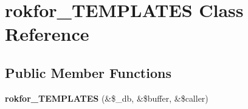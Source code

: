 \hypertarget{classrokfor___t_e_m_p_l_a_t_e_s}{
\section{rokfor\-\_\-\-T\-E\-M\-P\-L\-A\-T\-E\-S \-Class \-Reference}
\label{classrokfor___t_e_m_p_l_a_t_e_s}
}
\subsection*{\-Public \-Member \-Functions}
\begin{DoxyCompactItemize}
\item 
\hypertarget{classrokfor___t_e_m_p_l_a_t_e_s_a68ea25567fdd7bf7789e9412f78f78c0}{
{\bfseries rokfor\-\_\-\-T\-E\-M\-P\-L\-A\-T\-E\-S} (\&\$\-\_\-db, \&\$buffer, \&\$caller)}
\label{classrokfor___t_e_m_p_l_a_t_e_s_a68ea25567fdd7bf7789e9412f78f78c0}


\end{DoxyCompactItemize}
